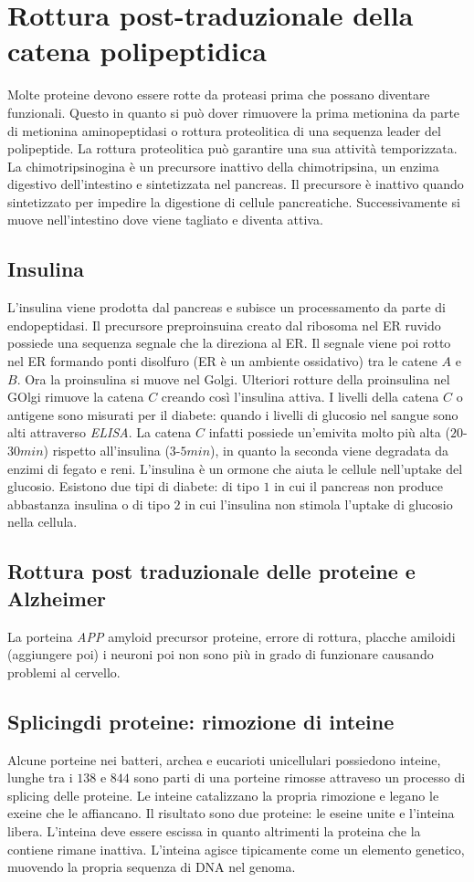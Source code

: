\section{Rottura post-traduzionale della catena polipeptidica}
Molte proteine devono essere rotte da proteasi prima che possano diventare funzionali. Questo in quanto si pu\`o dover rimuovere la prima metionina da parte di metionina aminopeptidasi o rottura proteolitica di una sequenza 
leader del polipeptide. La rottura proteolitica pu\`o garantire una sua attivit\`a temporizzata. La chimotripsinogina \`e un precursore inattivo della chimotripsina, un enzima digestivo dell'intestino e sintetizzata nel 
pancreas. Il precursore \`e inattivo quando sintetizzato per impedire la digestione di cellule pancreatiche. Successivamente si muove nell'intestino dove viene tagliato e diventa attiva. 
\subsection{Insulina}
L'insulina viene prodotta dal pancreas e subisce un processamento da parte di endopeptidasi. Il precursore preproinsuina creato dal ribosoma nel ER ruvido possiede una sequenza segnale che la direziona al ER\@. Il segnale
viene poi rotto nel ER formando ponti disolfuro (ER \`e un ambiente ossidativo) tra le catene $A$ e $B$. Ora la proinsulina si muove nel Golgi. Ulteriori rotture della proinsulina nel GOlgi rimuove la catena $C$ creando
cos\`i l'insulina attiva. I livelli della catena $C$ o antigene sono misurati per il diabete: quando i livelli di glucosio nel sangue sono alti attraverso \emph{ELISA}. La catena $C$ infatti possiede un'emivita molto pi\`u
alta ($20$-$30min$) rispetto all'insulina ($3$-$5min$), in quanto la seconda viene degradata da enzimi di fegato e reni. L'insulina \`e un ormone che aiuta le cellule nell'uptake del glucosio. Esistono due tipi di diabete:
di tipo $1$ in cui il pancreas non produce abbastanza insulina o di tipo $2$ in cui l'insulina non stimola l'uptake di glucosio nella cellula. 
\subsection{Rottura post traduzionale delle proteine e Alzheimer}
La porteina \emph{APP} amyloid precursor proteine, errore di rottura, placche amiloidi (aggiungere poi) 
i neuroni poi non sono pi\`u in grado di funzionare causando problemi al cervello. 
\subsection{Splicingdi proteine: rimozione di inteine}
Alcune porteine nei batteri, archea e eucarioti unicellulari possiedono inteine, lunghe tra i $138$ e $844$ sono parti di una porteine rimosse attraveso un processo di splicing delle proteine. Le inteine catalizzano la 
propria rimozione e legano le exeine che le affiancano. Il risultato sono due proteine: le eseine unite e l'inteina libera. L'inteina deve essere escissa in quanto altrimenti la proteina che la contiene rimane inattiva. 
L'inteina agisce tipicamente come un elemento genetico, muovendo la propria sequenza di DNA nel genoma. 
